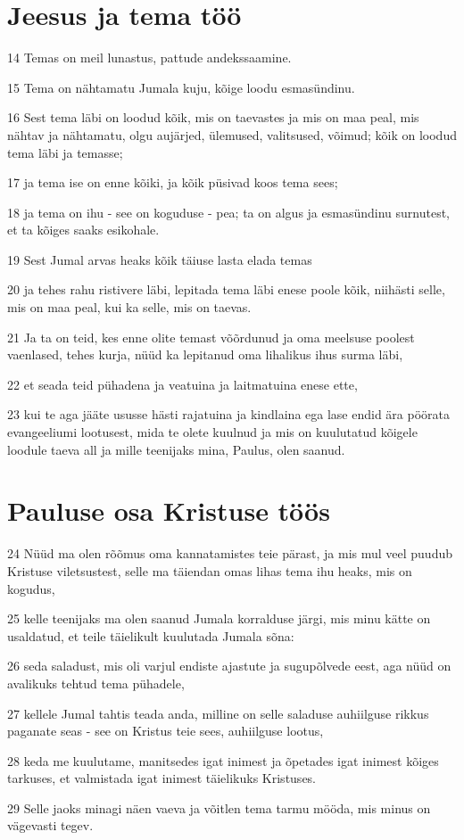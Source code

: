 \section*{Jeesus ja tema töö}

\par 14 Temas on meil lunastus, pattude andekssaamine.
\par 15 Tema on nähtamatu Jumala kuju, kõige loodu esmasündinu.
\par 16 Sest tema läbi on loodud kõik, mis on taevastes ja mis on maa peal, mis nähtav ja nähtamatu, olgu aujärjed, ülemused, valitsused, võimud; kõik on loodud tema läbi ja temasse;
\par 17 ja tema ise on enne kõiki, ja kõik püsivad koos tema sees;
\par 18 ja tema on ihu - see on koguduse - pea; ta on algus ja esmasündinu surnutest, et ta kõiges saaks esikohale.
\par 19 Sest Jumal arvas heaks kõik täiuse lasta elada temas
\par 20 ja tehes rahu ristivere läbi, lepitada tema läbi enese poole kõik, niihästi selle, mis on maa peal, kui ka selle, mis on taevas.
\par 21 Ja ta on teid, kes enne olite temast võõrdunud ja oma meelsuse poolest vaenlased, tehes kurja, nüüd ka lepitanud oma lihalikus ihus surma läbi,
\par 22 et seada teid pühadena ja veatuina ja laitmatuina enese ette,
\par 23 kui te aga jääte ususse hästi rajatuina ja kindlaina ega lase endid ära pöörata evangeeliumi lootusest, mida te olete kuulnud ja mis on kuulutatud kõigele loodule taeva all ja mille teenijaks mina, Paulus, olen saanud.

\section*{Pauluse osa Kristuse töös}

\par 24 Nüüd ma olen rõõmus oma kannatamistes teie pärast, ja mis mul veel puudub Kristuse viletsustest, selle ma täiendan omas lihas tema ihu heaks, mis on kogudus,
\par 25 kelle teenijaks ma olen saanud Jumala korralduse järgi, mis minu kätte on usaldatud, et teile täielikult kuulutada Jumala sõna:
\par 26 seda saladust, mis oli varjul endiste ajastute ja sugupõlvede eest, aga nüüd on avalikuks tehtud tema pühadele,
\par 27 kellele Jumal tahtis teada anda, milline on selle saladuse auhiilguse rikkus paganate seas - see on Kristus teie sees, auhiilguse lootus,
\par 28 keda me kuulutame, manitsedes igat inimest ja õpetades igat inimest kõiges tarkuses, et valmistada igat inimest täielikuks Kristuses.
\par 29 Selle jaoks minagi näen vaeva ja võitlen tema tarmu mööda, mis minus on vägevasti tegev.




